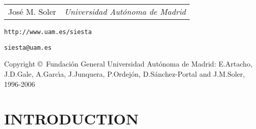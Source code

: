 \documentclass[11pt]{article}
\begin{document}
\begin{titlepage}
\begin{center}
{\begin{tabular}{ll}
{\Large Jos\'e M. Soler} &
   \Large{\it Universidad Aut\'onoma de Madrid}

\end{tabular}
}

\vspace{0.5cm}
{\Large {\tt http://www.uam.es/siesta} }

\vspace{2mm}
{\Large \tt siesta@uam.es}

\vspace{1cm}
Copyright \copyright\  Fundaci\'on General Universidad Aut\'onoma de Madrid:
E.Artacho, J.D.Gale, A.Garc\'{\i}a, J.Junquera, P.Ordej\'on,
D.S\'anchez-Portal and J.M.Soler, 1996-2006

\end{center}

\end{titlepage}


\tableofcontents

\newpage



\section{INTRODUCTION}
\end{document}
